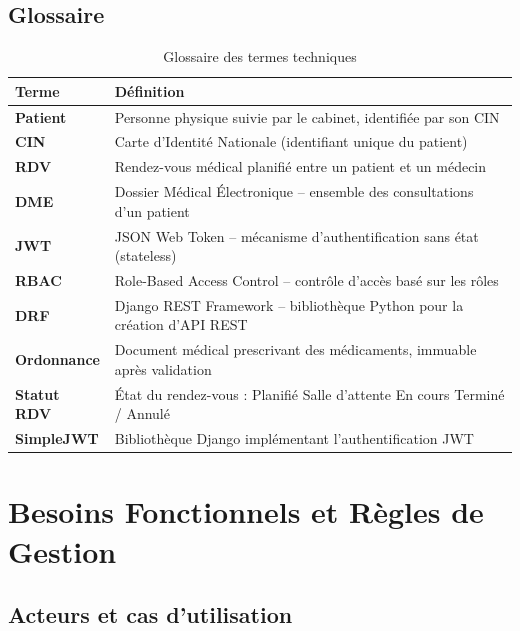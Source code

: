 \documentclass[12pt,a4paper]{report}
\begin{document}
\section{Glossaire}

\begin{table}[H]
\centering
\caption{Glossaire des termes techniques}
\renewcommand{\arraystretch}{1.4}
\begin{tabular}{|p{3cm}|p{11cm}|}
  \hline
  \rowcolor{medaccent}
  \textbf{Terme} & \textbf{Définition} \\
  \hline
  \textbf{Patient} & Personne physique suivie par le cabinet, identifiée par son CIN \\
  \hline
  \textbf{CIN} & Carte d'Identité Nationale (identifiant unique du patient) \\
  \hline
  \textbf{RDV} & Rendez-vous médical planifié entre un patient et un médecin \\
  \hline
  \textbf{DME} & Dossier Médical Électronique -- ensemble des consultations d'un patient \\
  \hline
  \textbf{JWT} & JSON Web Token -- mécanisme d'authentification sans état (stateless) \\
  \hline
  \textbf{RBAC} & Role-Based Access Control -- contrôle d'accès basé sur les rôles \\
  \hline
  \textbf{DRF} & Django REST Framework -- bibliothèque Python pour la création d'API REST \\
  \hline
  \textbf{Ordonnance} & Document médical prescrivant des médicaments, immuable après validation \\
  \hline
  \textbf{Statut RDV} & État du rendez-vous : Planifié \textrightarrow{} Salle d'attente \textrightarrow{} En cours \textrightarrow{} Terminé / Annulé \\
  \hline
  \textbf{SimpleJWT} & Bibliothèque Django implémentant l'authentification JWT \\
  \hline
\end{tabular}
\end{table}

\chapter{Besoins Fonctionnels et Règles de Gestion}

\section{Acteurs et cas d'utilisation}
\end{document}
